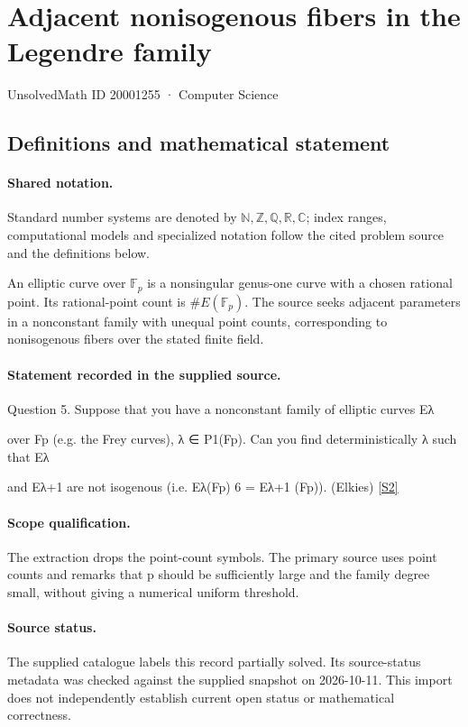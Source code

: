 \documentclass[11pt]{article}
\newcommand{\sref}[2]{\hyperlink{source:#1:#2}{[S#2]}}
\begin{document}
\setcounter{section}{20001254}
\section{Adjacent nonisogenous fibers in the Legendre family}\label{20001255}
{\small\sffamily UnsolvedMath ID 20001255 · Computer Science}
\subsection{Definitions and mathematical statement}

\paragraph{Shared notation.}Standard number systems are denoted by $\mathbb N,\mathbb Z,\mathbb Q,\mathbb R,\mathbb C$; index ranges, computational models and specialized notation follow the cited problem source and the definitions below.


An elliptic curve over $\mathbb F_p$ is a nonsingular genus-one curve with a chosen rational point. Its rational-point count is $\#E(\mathbb F_p)$. The source seeks adjacent parameters in a nonconstant family with unequal point counts, corresponding to nonisogenous fibers over the stated finite field.
\paragraph{Statement recorded in the supplied source.}
Question 5. Suppose that you have a nonconstant family of elliptic curves Eλ

over Fp (e.g. the Frey curves), λ ∈ P1(Fp). Can you find deterministically λ such that Eλ

and Eλ+1 are not isogenous (i.e. Eλ(Fp) 6 = Eλ+1 (Fp)). (Elkies) \sref{20001255}{2}
\paragraph{Scope qualification.}
The extraction drops the point-count symbols. The primary source uses point counts and remarks that p should be sufficiently large and the family degree small, without giving a numerical uniform threshold.
\paragraph{Source status.}
The supplied catalogue labels this record partially solved. Its source-status metadata was checked against the supplied snapshot on 2026-10-11. This import does not independently establish current open status or mathematical correctness.
\end{document}
